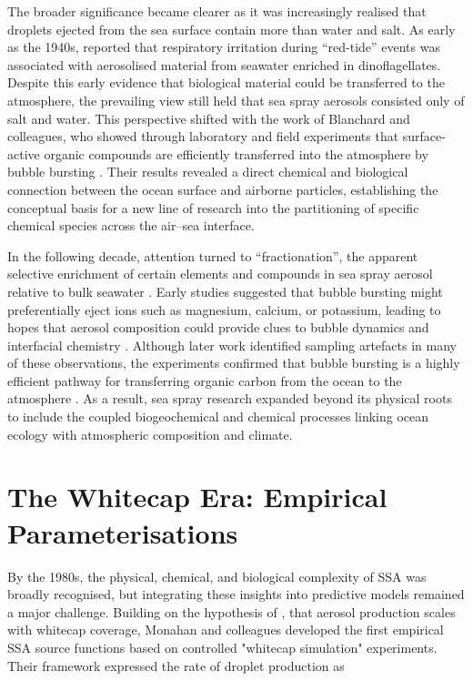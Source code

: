 \documentclass[ProofPDF]{./Styles/Jnls-Template-V3}
\begin{document}
The broader significance became clearer as it was increasingly realised that droplets ejected from the sea surface contain more than water and salt. As early as the 1940s, \citet{Woodcock1948} reported that respiratory irritation during ``red-tide'' events was associated with aerosolised material from seawater enriched in dinoflagellates. Despite this early evidence that biological material could be transferred to the atmosphere, the prevailing view still held that sea spray aerosols consisted only of salt and water. This perspective shifted with the work of Blanchard and colleagues, who showed through laboratory and field experiments that surface-active organic compounds are efficiently transferred into the atmosphere by bubble bursting \citep{Blanchard1963,Blanchard1964}. Their results revealed a direct chemical and biological connection between the ocean surface and airborne particles, establishing the conceptual basis for a new line of research into the partitioning of specific chemical species across the air–sea interface.

In the following decade, attention turned to ``fractionation'', the apparent selective enrichment of certain elements and compounds in sea spray aerosol relative to bulk seawater \citep{Macintyre1970,Barker1972,Duce1976}. Early studies suggested that bubble bursting might preferentially eject ions such as magnesium, calcium, or potassium, leading to hopes that aerosol composition could provide clues to bubble dynamics and interfacial chemistry \citep[e.g.][]{Komabayasi1964}. Although later work identified sampling artefacts in many of these observations, the experiments confirmed that bubble bursting is a highly efficient pathway for transferring organic carbon from the ocean to the atmosphere \citep{Barker1972,Duce1976,Hoffman1977}. As a result, sea spray research expanded beyond its physical roots to include the coupled biogeochemical and chemical processes linking ocean ecology with atmospheric composition and climate.

\section{The Whitecap Era: Empirical Parameterisations}

By the 1980s, the physical, chemical, and biological complexity of SSA was broadly recognised, but integrating these insights into predictive models remained a major challenge. Building on the hypothesis of \citet{Blanchard1963}, that aerosol production scales with whitecap coverage, Monahan and colleagues developed the first empirical SSA source functions based on controlled "whitecap simulation" experiments. Their framework expressed the rate of droplet production as
\end{document}
